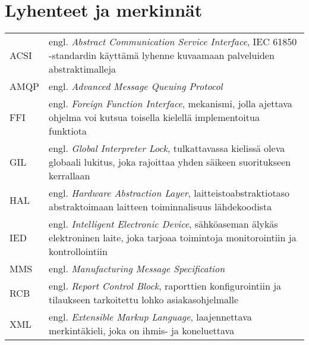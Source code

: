 \chapter*{Lyhenteet ja merkinnät}
\label{ch:lyhenteetjamerkinnat}

\begin{tabular}[h]{@{} p{} p{} @{}}
	ACSI & engl. \emph{Abstract Communication Service Interface}, IEC 61850 -standardin käyttämä lyhenne kuvaamaan palveluiden abstraktimalleja \\
	AMQP & engl. \emph{Advanced Message Queuing Protocol} \\
	FFI & engl. \emph{Foreign Function Interface}, mekanismi, jolla ajettava ohjelma voi kutsua toisella kielellä implementoitua funktiota\\
	GIL & engl. \emph{Global Interpreter Lock}, tulkattavassa kielissä oleva globaali lukitus, joka rajoittaa yhden säikeen suoritukseen kerrallaan \\
	HAL & engl. \emph{Hardware Abstraction Layer}, laitteistoabstraktiotaso abstraktoimaan laitteen toiminnalisuus lähdekoodista \\
	IED & engl. \emph{Intelligent Electronic Device}, sähköaseman älykäs elektroninen laite, joka tarjoaa toimintoja monitorointiin ja kontrollointiin \\
	MMS & engl. \emph{Manufacturing Message Specification} \\
	RCB & engl. \emph{Report Control Block}, raporttien konfigurointiin ja tilaukseen tarkoitettu lohko asiakasohjelmalle \\
	XML & engl. \emph{Extensible Markup Language}, laajennettava merkintäkieli, joka on ihmis- ja koneluettava
\end{tabular}